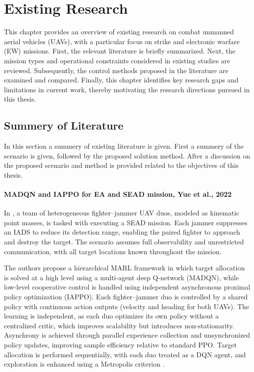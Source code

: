 

\chapter{Existing Research}

This chapter provides an overview of existing research on combat unmanned aerial vehicles (UAVs), with a particular focus on strike and electronic warfare (EW) missions. First, the relevant literature is briefly summarized. Next, the mission types and operational constraints considered in existing studies are reviewed. Subsequently, the control methods proposed in the literature are examined and compared. Finally, this chapter identifies key research gaps and limitations in current work, thereby motivating the research directions pursued in this thesis.


\section{Summery of Literature}
In this section a summery of existing literature is given. First a summery of the scenario is given, followed by the proposed solution method. After a discussion on the proposed scenario and method is provided related to the objectives of this thesis. 

\subsubsection{MADQN and IAPPO for EA and SEAD mission, Yue et al., 2022}
In \cite{yue2022uav_sead_hmarl}, a team of heterogeneous fighter–jammer UAV duos, modeled as kinematic point masses, is tasked with executing a SEAD mission. Each jammer suppresses an IADS to reduce its detection range, enabling the paired fighter to approach and destroy the target. The scenario assumes full observability and unrestricted communication, with all target locations known throughout the mission.

The authors propose a hierarchical MARL framework in which target allocation is solved at a high level using a multi-agent deep Q-network (MADQN), while low-level cooperative control is handled using independent asynchronous proximal policy optimization (IAPPO). Each fighter–jammer duo is controlled by a shared policy with continuous action outputs (velocity and heading for both UAVs). The learning is independent, as each duo optimizes its own policy without a centralized critic, which improves scalability but introduces non-stationarity. Asynchrony is achieved through parallel experience collection and unsynchronized policy updates, improving sample efficiency relative to standard PPO. Target allocation is performed sequentially, with each duo treated as a DQN agent, and exploration is enhanced using a Metropolis criterion \cite{yue2022uav_sead_hmarl}.

